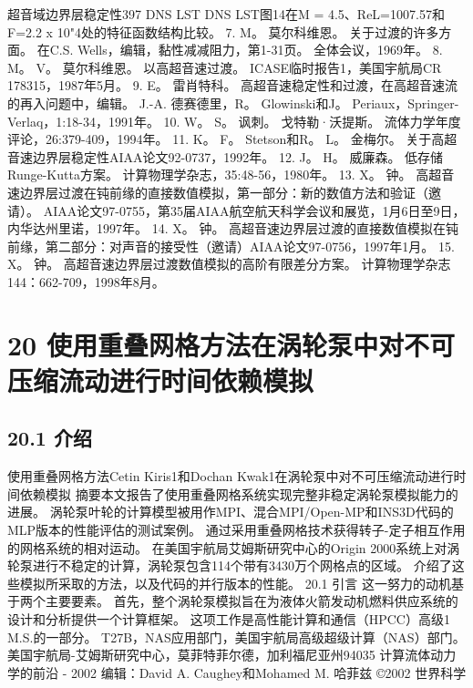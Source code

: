 \documentclass[UTF8,11pt,a4paper,openany,fontset=fandol]{ctexbook}
\begin{document}
超音域边界层稳定性397 DNS LST DNS LST图14在M = 4.5、ReL=1007.57和F=2.2 x 10"4处的特征函数结构比较。 7. M。 莫尔科维恩。 关于过渡的许多方面。 在C.S. Wells，编辑，黏性减减阻力，第1-31页。 全体会议，1969年。 8. M。 V。 莫尔科维恩。 以高超音速过渡。 ICASE临时报告1，美国宇航局CR 178315，1987年5月。 9. E。 雷肖特科。 高超音速稳定性和过渡，在高超音速流的再入问题中，编辑。 J.-A. 德赛德里，R。 Glowinski和J。 Periaux，Springer-Verlaq，1:18-34，1991年。 10. W。 S。 讽刺。 戈特勒·沃提斯。 流体力学年度评论，26:379-409，1994年。 11. K。 F。 Stetson和R。 L。 金梅尔。 关于高超音速边界层稳定性AIAA论文92-0737，1992年。 12. J。 H。 威廉森。 低存储Runge-Kutta方案。 计算物理学杂志，35:48-56，1980年。 13. X。 钟。 高超音速边界层过渡在钝前缘的直接数值模拟，第一部分：新的数值方法和验证（邀请）。 AIAA论文97-0755，第35届AIAA航空航天科学会议和展览，1月6日至9日，内华达州里诺，1997年。 14. X。 钟。 高超音速边界层过渡的直接数值模拟在钝前缘，第二部分：对声音的接受性（邀请）AIAA论文97-0756，1997年1月。 15. X。 钟。 高超音速边界层过渡数值模拟的高阶有限差分方案。 计算物理学杂志144：662-709，1998年8月。

\clearpage
\chapter{20 使用重叠网格方法在涡轮泵中对不可压缩流动进行时间依赖模拟}
\section{20.1 介绍}
使用重叠网格方法Cetin Kiris1和Dochan Kwak1在涡轮泵中对不可压缩流动进行时间依赖模拟 摘要本文报告了使用重叠网格系统实现完整非稳定涡轮泵模拟能力的进展。 涡轮泵叶轮的计算模型被用作MPI、混合MPI/Open-MP和INS3D代码的MLP版本的性能评估的测试案例。 通过采用重叠网格技术获得转子-定子相互作用的网格系统的相对运动。 在美国宇航局艾姆斯研究中心的Origin 2000系统上对涡轮泵进行不稳定的计算，涡轮泵包含114个带有3430万个网格点的区域。 介绍了这些模拟所采取的方法，以及代码的并行版本的性能。 20.1 引言 这一努力的动机基于两个主要要素。 首先，整个涡轮泵模拟旨在为液体火箭发动机燃料供应系统的设计和分析提供一个计算框架。 这项工作是高性能计算和通信（HPCC）高级1 M.S.的一部分。 T27B，NAS应用部门，美国宇航局高级超级计算（NAS）部门。 美国宇航局-艾姆斯研究中心，莫菲特菲尔德，加利福尼亚州94035 计算流体动力学的前沿 - 2002 编辑：David A. Caughey和Mohamed M. 哈菲兹 ©2002 世界科学
\end{document}
